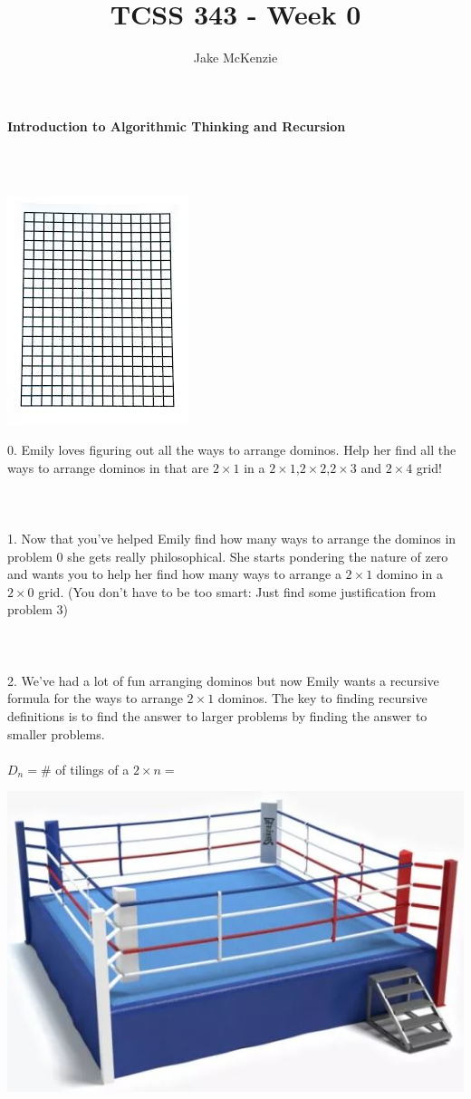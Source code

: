 \documentclass[12pt]{article}
\begin{document}
\title{TCSS 343 - Week 0}
\author{Jake McKenzie}
\maketitle
\noindent\centerline{\textbf{Introduction to Algorithmic Thinking and Recursion}}\\\\
\newpage
\centerline{\includegraphics[angle = 90]{grid.jpg}}
0. Emily loves figuring out all the ways to arrange dominos. Help her find all the ways to arrange dominos in that are $2 \times 1$ in a $2 \times 1$,$2 \times 2$,$2 \times 3$ and $2 \times 4$ grid!\\\\\\\\
1. Now that you've helped Emily find how many ways to arrange the dominos in problem 0 she gets really philosophical. She starts pondering the nature of zero and wants you to help her find how many ways to arrange a $2 \times 1$ domino in a $2 \times 0$ grid. (You don't have to be too smart: Just find some justification from problem 3)\\\\\\\\
2. We've had a lot of fun arranging dominos but now Emily wants a recursive formula for the ways to arrange $2 \times 1$ dominos. The key to finding recursive definitions is to find the answer to larger problems by finding the answer to smaller problems.\\\\
$D_n = $\# of tilings of a $2 \times n =$
\newpage
\centerline{\includegraphics[scale = 0.25]{boxing.jpg}}
\end{document}

